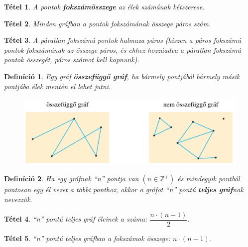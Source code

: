 \documentclass[12pt,a4paper]{article}
\newtheorem{theorem}{Tétel} [section]
\newtheorem{definition}{Definíció} [section]
\begin{document}
\begin{theorem}
A pontok \textbf{fokszámösszege} az élek számának kétszerese.
\end{theorem}

\begin{theorem}
Minden gráfban a pontok fokszámának összege páros szám.
\end{theorem}

\begin{theorem}
A páratlan fokszámú pontok halmaza páros (hiszen a páros fokszámú pontok fokszámának az összege páros, és ehhez hozzáadva a páratlan fokszámú pontok összegét, páros számot kell kapnunk).
\end{theorem}

\begin{definition}
Egy gráf \textbf{összefüggő gráf}, ha bármely pontjából bármely másik pontjába élek mentén el lehet jutni.
\end{definition}
\begin{figure}[h]
\centering
\includegraphics[scale=0.3]{geometry/osszefuggo_graf}
\end{figure}

\begin{definition}
Ha egy gráfnak ``n'' pontja van $(n\in \mathbb{Z}^+)$ és mindegyik pontból pontosan egy él vezet a többi ponthoz, akkor a gráfot ``n'' pontú \textbf{teljes gráf}nak nevezzük.
\end{definition}

\begin{theorem}
``n'' pontú teljes gráf éleinek a száma: $\dfrac{n\cdot (n-1)}{2}$.
\end{theorem}

\begin{theorem}
``n'' pontú teljes gráfban a fokszámok összege: $n\cdot (n-1)$.
\end{theorem}
\end{document}

